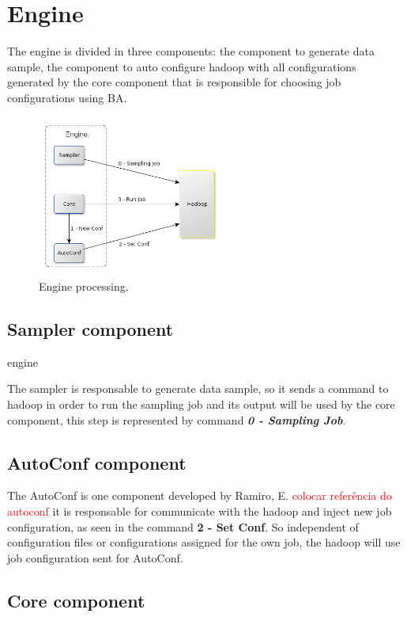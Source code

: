 \section{Engine}

The engine is divided in three components: the component to generate
data sample, the component to auto configure hadoop with all configurations generated
by the core component that is responsible for choosing job configurations using BA.

\begin{figure}[htbp]
	\centering
	\includegraphics[width=230px,height=200px]{img/engine.png}
	\caption{Engine processing.}\label{fig:engine}
\end{figure}

\subsection{Sampler component}engine

The sampler is responsable to generate data sample, so it sends a command to hadoop
in order to run the sampling job and its output will be used by the core component,
this step is represented by command {\it \bf 0 - Sampling Job}.

\subsection{AutoConf component}

The AutoConf is one component developed by Ramiro, E. \textcolor{red}{colocar referência do autoconf}
it is responsable for communicate with the hadoop and inject new job configuration,
as seen in the command {\bf 2 - Set Conf}. So independent of configuration files
or configurations assigned for the own job, the hadoop will use job configuration
sent for AutoConf.

\subsection{Core component}


